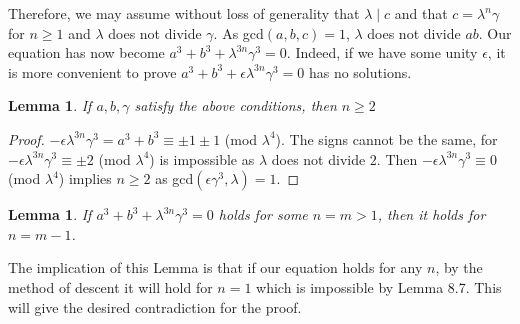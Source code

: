 \documentclass{article}
\newtheorem{lemma}[theorem]{Lemma}
\theoremstyle{definition}
\theoremstyle{definition}
\theoremstyle{definition}
\begin{document}
    Therefore, we may assume without loss of generality that $\lambda\mid c$ and that $c=\lambda^n\gamma$ for $n\geq1$ and $\lambda$ does not divide $\gamma$. As gcd$(a,b,c)=1$, $\lambda$ does not divide $ab$. Our equation has now become $a^3+b^3+\lambda^{3n}\gamma^3=0$. Indeed, if we have some unity $\epsilon$, it is more convenient to prove $a^3+b^3+\epsilon\lambda^{3n}\gamma^3=0$ has no solutions.

    \begin{lemma}
        If $a,b,\gamma$ satisfy the above conditions, then $n\geq2$
    \end{lemma}

    \begin{proof}
        $-\epsilon\lambda^{3n}\gamma^3=a^3+b^3\equiv \pm1\pm1$ (mod $\lambda^4$). The signs cannot be the same, for $-\epsilon\lambda^{3n}\gamma^3\equiv \pm2$ (mod $\lambda^4$) is impossible as $\lambda$ does not divide $2$. Then $-\epsilon\lambda^{3n}\gamma^3\equiv 0$ (mod $\lambda^4$) implies $n\geq2$ as gcd$(\epsilon\gamma^3, \lambda)=1$.
    \end{proof}

    \begin{lemma}\label{final n=3}
        If $a^3+b^3+\lambda^{3n}\gamma^3=0$ holds for some $n=m>1$, then it holds for $n=m-1$.
    \end{lemma}

    The implication of this Lemma is that if our equation holds for any $n$, by the method of descent it will hold for $n=1$ which is impossible by Lemma 8.7. This will give the desired contradiction for the proof.
\end{document}
